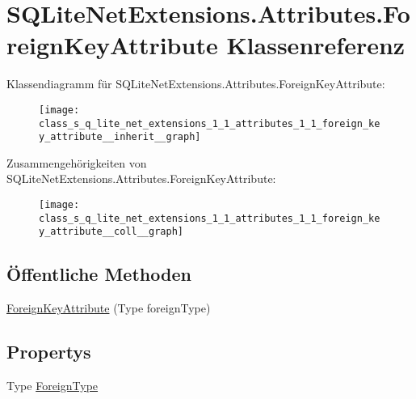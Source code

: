\hypertarget{class_s_q_lite_net_extensions_1_1_attributes_1_1_foreign_key_attribute}{}\section{S\+Q\+Lite\+Net\+Extensions.\+Attributes.\+Foreign\+Key\+Attribute Klassenreferenz}
\label{class_s_q_lite_net_extensions_1_1_attributes_1_1_foreign_key_attribute}


Klassendiagramm für S\+Q\+Lite\+Net\+Extensions.\+Attributes.\+Foreign\+Key\+Attribute\+:\nopagebreak
\begin{figure}[H]
\begin{center}
\leavevmode
\texttt{[image: class\_s\_q\_lite\_net\_extensions\_1\_1\_attributes\_1\_1\_foreign\_key\_attribute\_\_inherit\_\_graph]}
\end{center}
\end{figure}


Zusammengehörigkeiten von S\+Q\+Lite\+Net\+Extensions.\+Attributes.\+Foreign\+Key\+Attribute\+:\nopagebreak
\begin{figure}[H]
\begin{center}
\leavevmode
\texttt{[image: class\_s\_q\_lite\_net\_extensions\_1\_1\_attributes\_1\_1\_foreign\_key\_attribute\_\_coll\_\_graph]}
\end{center}
\end{figure}
\subsection*{Öffentliche Methoden}
\begin{DoxyCompactItemize}
\item 
\mbox{\hyperlink{class_s_q_lite_net_extensions_1_1_attributes_1_1_foreign_key_attribute_a02f773c238f632af29551c709180a138}{Foreign\+Key\+Attribute}} (Type foreign\+Type)
\end{DoxyCompactItemize}
\subsection*{Propertys}
\begin{DoxyCompactItemize}
\item 
Type \mbox{\hyperlink{class_s_q_lite_net_extensions_1_1_attributes_1_1_foreign_key_attribute_aacea2bb25b66d54a2af4aeba118f4bb9}{Foreign\+Type}}
\end{DoxyCompactItemize}


